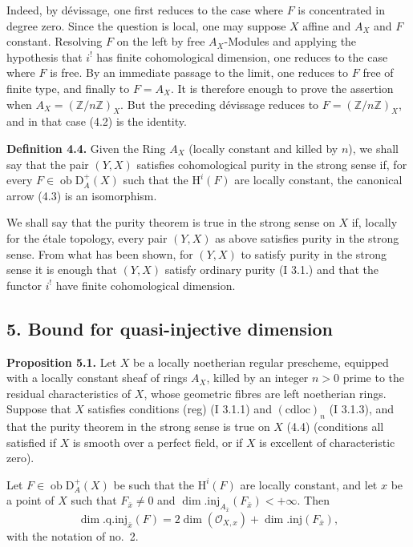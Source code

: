 \documentclass[11pt]{article}
\renewcommand{\H}{\mathrm{H}}
\newcommand{\D}{\mathrm{D}}
\newcommand{\Z}{\mathbb{Z}}
\newcommand{\ob}{\operatorname{ob}}
\providecommand{\ob}{\operatorname{ob}}
\providecommand{\Z}{\mathbb Z}
\begin{document}
Indeed, by dévissage, one first reduces to the case where $F$ is concentrated in degree zero. Since the question is local, one may suppose $X$ affine and $A_X$ and $F$ constant. Resolving $F$ on the left by free $A_X$-Modules and applying the hypothesis that $i^!$ has finite cohomological dimension, one reduces to the case where $F$ is free. By an immediate passage to the limit, one reduces to $F$ free of finite type, and finally to $F=A_X$. It is therefore enough to prove the assertion when $A_X=(\Z/n\Z)_X$. But the preceding dévissage reduces to $F=(\Z/n\Z)_X$, and in that case (4.2) is the identity.

\textbf{Definition 4.4.} Given the Ring $A_X$ (locally constant and killed by $n$), we shall say that the pair $(Y,X)$ satisfies cohomological purity in the strong sense if, for every $F\in\ob\D_A^+(X)$ such that the $\H^i(F)$ are locally constant, the canonical arrow (4.3) is an isomorphism.

We shall say that the purity theorem is true in the strong sense on $X$ if, locally for the étale topology, every pair $(Y,X)$ as above satisfies purity in the strong sense. From what has been shown, for $(Y,X)$ to satisfy purity in the strong sense it is enough that $(Y,X)$ satisfy ordinary purity (I 3.1.) and that the functor $i^!$ have finite cohomological dimension.

\subsection*{5. Bound for quasi-injective dimension}

\textbf{Proposition 5.1.} Let $X$ be a locally noetherian regular prescheme, equipped with a locally constant sheaf of rings $A_X$, killed by an integer $n>0$ prime to the residual characteristics of $X$, whose geometric fibres are left noetherian rings. Suppose that $X$ satisfies conditions (reg) (I 3.1.1) and $(\mathrm{cdloc})_n$ (I 3.1.3), and that the purity theorem in the strong sense is true on $X$ (4.4) (conditions all satisfied if $X$ is smooth over a perfect field, or if $X$ is excellent of characteristic zero).

Let $F\in\ob\D_A^+(X)$ be such that the $\H^i(F)$ are locally constant, and let $x$ be a point of $X$ such that $F_{\bar{x}}\neq0$ and $\dim.\mathrm{inj}_{A_{\bar{x}}}(F_{\bar{x}})<+\infty$. Then
\[
        \dim.\mathrm{q.inj}_{\bar{x}}(F)=2\dim(\mathcal{O}_{X,x})+\dim.\mathrm{inj}(F_{\bar{x}}),
\]
with the notation of no.~2.
\end{document}
